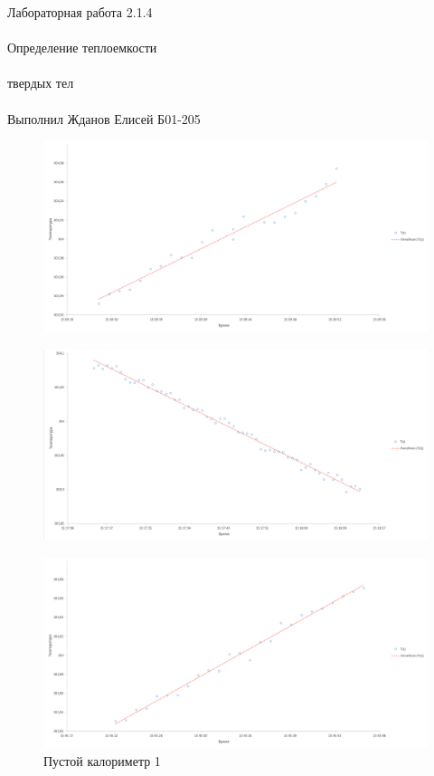 \documentclass{astroedu-lab}
\begin{document}
\begin{problem}{\huge Лабораторная работа 2.1.4\\\\Определение теплоемкости\\\\твердых тел\\\\Выполнил Жданов Елисей Б01-205}
\begin{figure}
		\begin{center}
			\begin{minipage}[h]{0.48\linewidth}
				\includegraphics[width=1\linewidth]{картинки/2023-02-12_00-06-26.png}
				\caption{Пустой калориметр 1} %
				\label{ris:dR_dt(r)_for_calorimetr} %
			\end{minipage}
		\hfill
			\begin{minipage}[h]{0.48\linewidth}
				\includegraphics[width=1\linewidth]{картинки/2023-02-12_00-07-16.png}
				\label{ris:dR_dt(r)_for_steel}
			\end{minipage}
		\end{center}
		\begin{center}
			\begin{minipage}[h]{0.48\linewidth}
				\includegraphics[width=1\linewidth]{картинки/2023-02-12_00-08-06.png}

\end{minipage}
\end{center}
\end{figure}
\end{problem}
\end{document}

